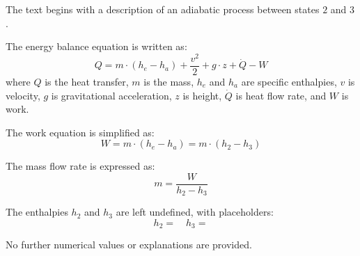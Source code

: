 The text begins with a description of an adiabatic process between states \(2\) and \(3\).  

The energy balance equation is written as:  
\[
Q = m \cdot (h_e - h_a) + \frac{v^2}{2} + g \cdot z + \dot{Q} - W
\]  
where \(Q\) is the heat transfer, \(m\) is the mass, \(h_e\) and \(h_a\) are specific enthalpies, \(v\) is velocity, \(g\) is gravitational acceleration, \(z\) is height, \(\dot{Q}\) is heat flow rate, and \(W\) is work.  

The work equation is simplified as:  
\[
W = m \cdot (h_e - h_a) = m \cdot (h_2 - h_3)
\]  

The mass flow rate is expressed as:  
\[
m = \frac{W}{h_2 - h_3}
\]  

The enthalpies \(h_2\) and \(h_3\) are left undefined, with placeholders:  
\[
h_2 = \quad h_3 =
\]  

No further numerical values or explanations are provided.